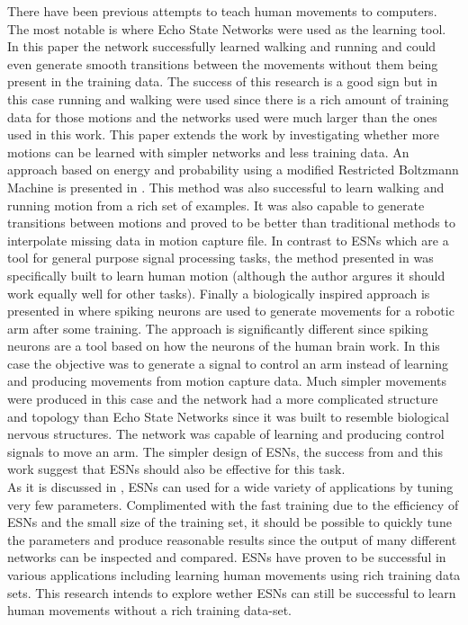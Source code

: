 \documentclass[letterpaper,9pt]{article}
\begin{document}
There have been previous attempts to teach human movements to computers. The most notable is \cite{GentHumanMotion} where Echo State Networks were used as the learning tool. In this paper the network successfully learned walking and running and could even generate smooth transitions between the movements without them being present in the training data. The success of this research is a good sign but in this case running and walking were used since there is a rich amount of training data for those motions and the networks used were much larger than the ones used in this work. This paper extends the work by investigating whether more motions can be learned with simpler networks and less training data. An approach based on energy and probability using a modified Restricted Boltzmann Machine is presented in \cite{TaylorModelingHuman}. This method was also successful to learn walking and running motion from a rich set of examples. It was also capable to generate transitions between motions and proved to be better than traditional methods to interpolate missing data in motion capture file. In contrast to ESNs which are a tool for general purpose  signal processing tasks, the method presented in \cite{TaylorModelingHuman} was specifically built to learn human motion (although the author argures it should work equally well for other tasks). Finally a biologically inspired approach is presented in \cite{Joshi05MovementGeneration} where spiking neurons are used to generate movements for a robotic arm after some training. The approach is significantly different since spiking neurons are a tool based on how the neurons of the human brain work. In this case the objective was to generate a signal to control an arm instead of learning and producing movements from motion capture data. Much simpler movements were produced in this case and the network had a more complicated structure and topology than Echo State Networks since it was built to resemble biological nervous structures. The network was capable of learning and producing control signals to move an arm. The simpler design of ESNs, the success from \cite{GentHumanMotion} and this work suggest that ESNs should also be effective for this task.\\

As it is discussed in \cite{ESNVerstraeten}, ESNs can used for a wide variety of applications by tuning very few parameters. Complimented with the fast training due to the efficiency of ESNs and the small size of the training set, it should be possible to quickly tune the parameters and produce reasonable results since the output of many different networks can be inspected and compared. ESNs have proven to be successful in various applications including learning human movements using rich training data sets. This research intends to explore wether ESNs can still be successful to learn human movements without a rich training data-set.
\end{document}
